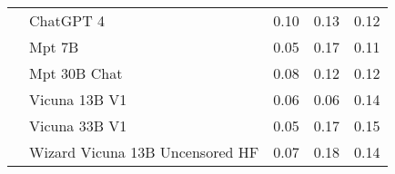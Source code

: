 \begin{table}[!htbp]
\begin{tabular}{l|l|rrr}
&ChatGPT 4 & {\cellcolor[HTML]{BEBEDD}} \color[HTML]{000000} 0.10 & {\cellcolor[HTML]{8885BE}} \color[HTML]{F1F1F1} 0.13 & {\cellcolor[HTML]{8B87BF}} \color[HTML]{F1F1F1} 0.12 \\
&Mpt 7B & {\cellcolor[HTML]{FCFBFD}} \color[HTML]{000000} 0.05 & {\cellcolor[HTML]{440A82}} \color[HTML]{F1F1F1} 0.17 & {\cellcolor[HTML]{A4A1CC}} \color[HTML]{F1F1F1} 0.11 \\
&Mpt 30B Chat & {\cellcolor[HTML]{E0DFEE}} \color[HTML]{000000} 0.08 & {\cellcolor[HTML]{9B97C6}} \color[HTML]{F1F1F1} 0.12 & {\cellcolor[HTML]{9692C4}} \color[HTML]{F1F1F1} 0.12 \\
&Vicuna 13B V1 & {\cellcolor[HTML]{F4F3F8}} \color[HTML]{000000} 0.06 & {\cellcolor[HTML]{F2F0F7}} \color[HTML]{000000} 0.06 & {\cellcolor[HTML]{796EB2}} \color[HTML]{F1F1F1} 0.14 \\
&Vicuna 33B V1 & {\cellcolor[HTML]{FCFBFD}} \color[HTML]{000000} 0.05 & {\cellcolor[HTML]{4D1A89}} \color[HTML]{F1F1F1} 0.17 & {\cellcolor[HTML]{65479E}} \color[HTML]{F1F1F1} 0.15 \\
&Wizard Vicuna 13B Uncensored HF & {\cellcolor[HTML]{EFEDF5}} \color[HTML]{000000} 0.07 & {\cellcolor[HTML]{3F007D}} \color[HTML]{F1F1F1} 0.18 & {\cellcolor[HTML]{7970B3}} \color[HTML]{F1F1F1} 0.14 \\
\bottomrule
    \end{tabular}
            
\end{table}
